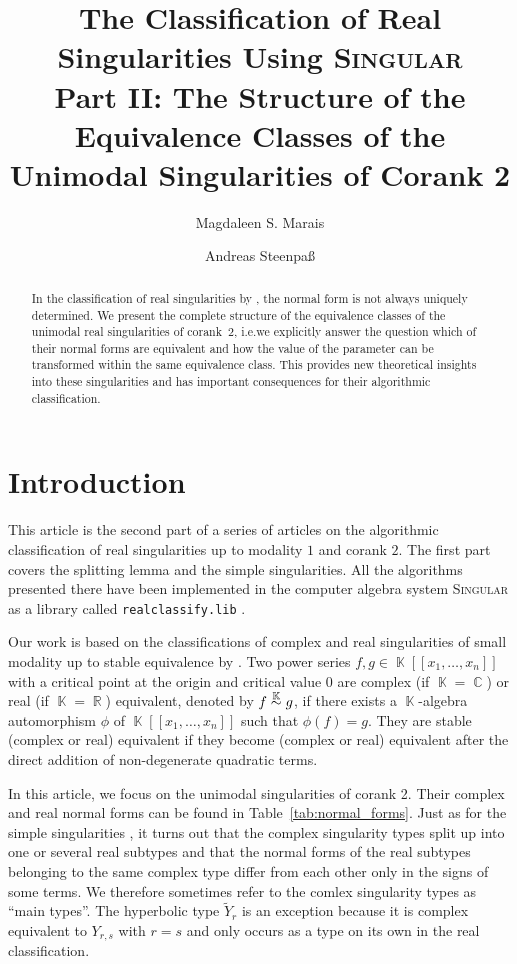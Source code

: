 \documentclass[noend]{amsproc}
\title[The Classification of Real Singularities Using \textsc{Singular}, %
Part II]%
{The Classification of Real Singularities Using \textsc{Singular}\\
Part II: The Structure of the Equivalence Classes of the Unimodal %
Singularities of Corank 2}
\author{Magdaleen S. Marais}
\author{Andreas Steenpa\ss}
\theoremstyle{definition}
\newcommand{\Singular}{\textsc{Singular}}
\newcommand{\realclassify}{\texttt{realclassify.lib}}
\newcommand{\tY}{\widetilde{Y}}
\DeclareMathOperator{\R}{\mathbb{R}}
\DeclareMathOperator{\C}{\mathbb{C}}
\DeclareMathOperator{\K}{\mathbb{K}}
\newcommand{\ksim}{\ensuremath{\mathrel{%
  \raisebox{0pt}[\heightof{$\overset{\scriptscriptstyle\K}{\sim}$}]{%
    $\overset{\K}{\sim}$%
  }%
}}}
\begin{document}
\begin{abstract}
In the classification of real singularities by \citet{AVG1985}, the normal form
is not always uniquely determined. We present the complete structure of the
equivalence classes of the unimodal real singularities of corank~$2$, i.e.\@ we
explicitly answer the question which of their normal forms are equivalent and
how the value of the parameter can be transformed within the same equivalence
class. This provides new theoretical insights into these singularities and has
important consequences for their algorithmic classification.
\end{abstract}

\maketitle


\section{Introduction}

This article is the second part of a series of articles on the algorithmic
classification of real singularities up to modality $1$ and corank $2$. The
first part \citep{MS2013} covers the splitting lemma and the simple
singularities. All the algorithms presented there have been implemented in the
computer algebra system \Singular{} \citep{DGPS} as a library called
\realclassify{} \citep{realclassify}.

Our work is based on the classifications of complex and real singularities of
small modality up to stable equivalence by \citet{AVG1985}. Two power series
$f, g \in \K[[x_1,\ldots,x_n]]$ with a critical point at the origin and
critical value $0$ are complex (if $\K = \C$) or real (if $\K = \R$)
equivalent, denoted by $f \ksim g$, if there exists a $\K$-algebra automorphism
$\phi$ of $\K[[x_1,\ldots,x_n]]$ such that $\phi(f) = g$. They are stable
(complex or real) equivalent if they become (complex or real) equivalent after
the direct addition of non-degenerate quadratic terms.

In this article, we focus on the unimodal singularities of corank 2. Their
complex and real normal forms can be found in Table~\ref{tab:normal_forms}.
Just as for the simple singularities \citep[cf.][]{MS2013}, it turns out that
the complex singularity types split up into one or several real subtypes and
that the normal forms of the real subtypes belonging to the same complex type
differ from each other only in the signs of some terms. We therefore sometimes
refer to the comlex singularity types as ``main types''. The hyperbolic type
$\tY_r$ is an exception because it is complex equivalent to $Y_{r,s}$ with
$r = s$ and only occurs as a type on its own in the real classification.
\end{document}
